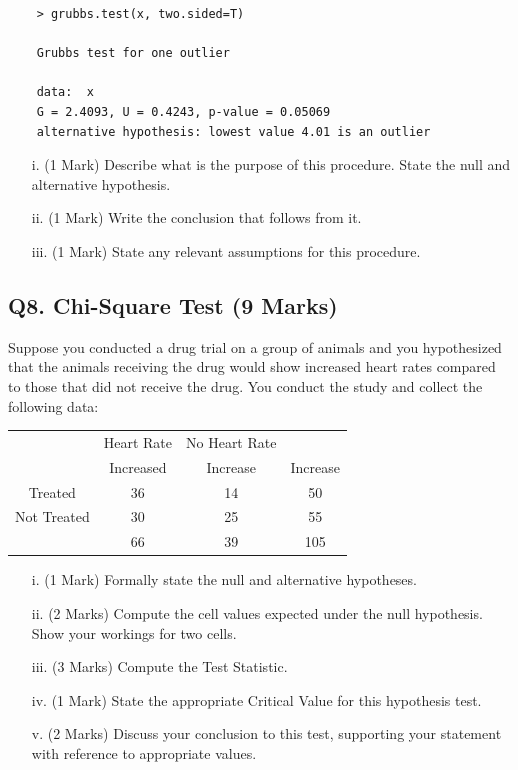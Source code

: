\documentclass[a4paper,12pt]{article}
\begin{document}
\begin{framed}

	\begin{verbatim}
	> grubbs.test(x, two.sided=T)
	
	Grubbs test for one outlier
	
	data:  x
	G = 2.4093, U = 0.4243, p-value = 0.05069
	alternative hypothesis: lowest value 4.01 is an outlier
	\end{verbatim}
\end{framed}

\begin{itemize}
	\item[i.] (1 Mark) Describe what is the purpose of this procedure. State the null and alternative hypothesis.
	\item[ii.] (1 Mark) Write the conclusion that follows from it.
	\item[iii.] (1 Mark) State any relevant assumptions for this procedure.
\end{itemize}

\subsection*{Q8. Chi-Square Test (9 Marks)} %
Suppose you conducted a drug trial on a group of animals and you hypothesized that the animals receiving the drug would show increased heart rates compared to those that did not receive the drug. You conduct the study and collect the following data:
{
	\large
\begin{center}
\begin{tabular}{|c|c|c|c|}
	\hline  & Heart Rate & No Heart Rate  &  \\  
	  & Increased & Increase & Increase \\ 
	\hline Treated  & 36 & 14 & 50 \\ 
	\hline Not Treated & 30 & 25 & 55 \\ 
	\hline  & 66 & 39 & 105 \\ 
	\hline 
\end{tabular} 
\end{center}
}
\begin{itemize}
	\item[i.](1 Mark) Formally state the null and alternative hypotheses.
	\item[ii.] (2 Marks) Compute the cell values expected under the null hypothesis. Show your workings for two cells.
	\item[iii.](3 Marks) Compute the Test Statistic.
	\item[iv.](1 Mark) State the appropriate Critical Value for this hypothesis test.
	\item[v.](2 Marks) Discuss your conclusion to this test, supporting your statement with reference to appropriate values.
\end{itemize}
\end{document}
